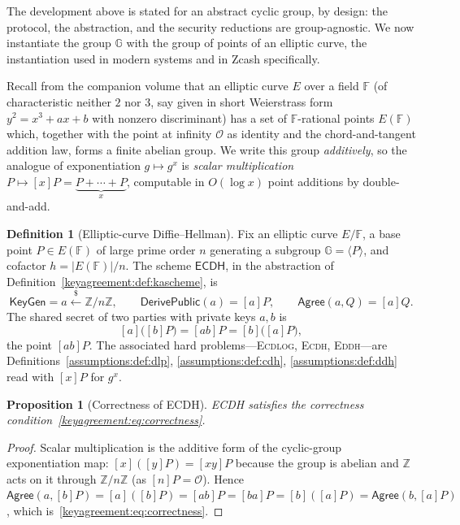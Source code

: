\documentclass[11pt,a4paper]{article}
\newtheorem{proposition}[theorem]{Proposition}
\theoremstyle{definition}
\newtheorem{definition}[theorem]{Definition}
\theoremstyle{remark}
\newcommand{\Z}{\ensuremath{\mathbb{Z}}}
\newcommand{\F}{\ensuremath{\mathbb{F}}}
\newcommand{\G}{\ensuremath{\mathbb{G}}}
\begin{document}
The development above is stated for an abstract cyclic group, by design: the protocol, the abstraction, and the security reductions are group-agnostic. We now instantiate the group \(\G\) with the group of points of an elliptic curve, the instantiation used in modern systems and in Zcash specifically.

Recall from the companion volume that an elliptic curve \(E\) over a field \(\F\) (of characteristic neither \(2\) nor \(3\), say given in short Weierstrass form \(y^2 = x^3 + a x + b\) with nonzero discriminant) has a set of \(\F\)-rational points \(E(\F)\) which, together with the point at infinity \(\mathcal{O}\) as identity and the chord-and-tangent addition law, forms a finite abelian group. We write this group \emph{additively}, so the analogue of exponentiation \(g \mapsto g^x\) is \emph{scalar multiplication} \(P \mapsto [x]P = \underbrace{P + \cdots + P}_{x}\), computable in \(O(\log x)\) point additions by double-and-add.

\begin{definition}[Elliptic-curve Diffie--Hellman]\label{keyagreement:def:ecdh}
Fix an elliptic curve \(E/\F\), a base point \(P \in E(\F)\) of large prime order \(n\) generating a subgroup \(\G = \langle P\rangle\), and cofactor \(h = |E(\F)|/n\). The scheme \(\mathsf{ECDH}\), in the abstraction of Definition~\ref{keyagreement:def:kascheme}, is
\[
  \mathsf{KeyGen} = a \xleftarrow{\$} \Z/n\Z,\qquad
  \mathsf{DerivePublic}(a) = [a]P,\qquad
  \mathsf{Agree}(a, Q) = [a]Q.
\]
The shared secret of two parties with private keys \(a, b\) is
\[
  [a]\bigl([b]P\bigr) = [ab]P = [b]\bigl([a]P\bigr),
\]
the point \([ab]P\). The associated hard problems---\textsc{Ecdlog}, \textsc{Ecdh}, \textsc{Eddh}---are Definitions~\ref{assumptions:def:dlp}, \ref{assumptions:def:cdh}, \ref{assumptions:def:ddh} read with \([x]P\) for \(g^x\).
\end{definition}

\begin{proposition}[Correctness of ECDH]\label{keyagreement:prop:ecdh-correct}
ECDH satisfies the correctness condition~\eqref{keyagreement:eq:correctness}.
\end{proposition}

\begin{proof}
Scalar multiplication is the additive form of the cyclic-group exponentiation map: \([x]([y]P) = [xy]P\) because the group is abelian and \(\Z\) acts on it through \(\Z/n\Z\) (as \([n]P = \mathcal{O}\)). Hence \(\mathsf{Agree}(a, [b]P) = [a]([b]P) = [ab]P = [ba]P = [b]([a]P) = \mathsf{Agree}(b, [a]P)\), which is~\eqref{keyagreement:eq:correctness}.
\end{proof}
\end{document}
